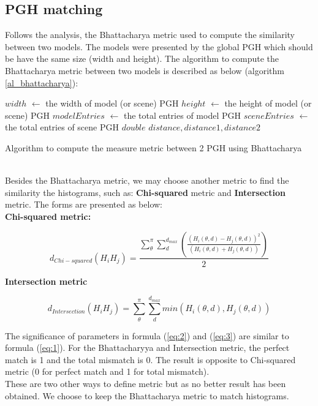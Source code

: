 \subsection{PGH matching}
Follows the analysis, the Bhattacharya metric used to compute the similarity between two models. The models were presented by the global PGH which should be have the same size (width and height). The algorithm to compute the Bhattacharya metric between two models is described as below (algorithm \ref{al_bhattacharya}):\\
\IncMargin{1em}
\begin{algorithm}[H]
\Indm 
{}
\SetAlgoLined
{}
\Indp
$width$ $\leftarrow$ the width of model (or scene) PGH\;
$height$ $\leftarrow$ the height of model (or scene) PGH \;
$modelEntries$ $\leftarrow$ the total entries of model PGH\;
$sceneEntries$ $\leftarrow$ the total entries of scene PGH\;
$double$ $distance, distance1, distance2$\;
\caption{Algorithm to compute the measure metric between 2 PGH using Bhattacharya}
\label{al_bhattacharya}
\end{algorithm}
\DecMargin{1em}~\\
Besides the Bhattacharya metric, we may choose another metric to find the similarity the histograms, such as: \textbf{Chi-squared} metric and \textbf{Intersection} metric. The forms are presented as below:\\[0.5cm]
\textbf{Chi-squared metric:}
\begin{center}
\begin{equation}\label{eq:2}
d_{Chi-squared} (H_{i}H_{j}) = \frac{\sum\limits_{\theta}^{\pi}\sum\limits_{d}^{d_{max}}(\frac{(H_{i}(\theta,d) - H_{j}(\theta,d))^{2}}{(H_{i}(\theta,d) + H_{j}(\theta,d))})}{2}
\end{equation}
\end{center}
\textbf{Intersection metric}
\begin{center}
\begin{equation}\label{eq:3}
d_{Intersection} (H_{i}H_{j}) = \sum\limits_{\theta}^{\pi}\sum\limits_{d}^{d_{max}}min(H_{i}(\theta,d), H_{j}(\theta,d))
\end{equation}
\end{center}
The significance of parameters in formula (\ref{eq:2}) and (\ref{eq:3}) are similar to formula (\ref{eq:1}). For the Bhattacharyya and Intersection metric, the perfect match is 1 and the total mismatch is 0. The result is opposite to Chi-squared metric (0 for perfect match and 1 for total mismatch).\\[0.2cm]
These are two other ways to define metric but as no better result has been obtained. We choose to keep the Bhattacharya metric to match histograms.

